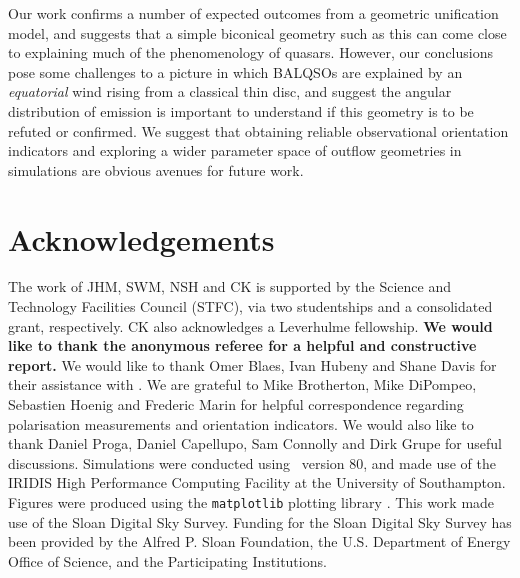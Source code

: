 \documentclass[useAMS,usenatbib]{mn2e_x}
\begin{document}
Our work confirms a number of expected outcomes from a geometric unification 
model, and suggests that a simple biconical geometry such as this can come close to 
explaining much of the  phenomenology of quasars. However, our conclusions pose 
some challenges to a picture in which BALQSOs are
explained by an {\em equatorial} wind rising from a classical thin disc, and suggest 
the angular distribution of emission is important to understand if this 
geometry is to be refuted or confirmed. We suggest that obtaining reliable 
observational orientation indicators and 
exploring a wider parameter space of outflow geometries in simulations
are obvious avenues for future work.


\section*{Acknowledgements}

The work of JHM, SWM, NSH and CK is supported by the
Science and Technology Facilities Council (STFC),
via two studentships and a consolidated grant, respectively.
CK also acknowledges a Leverhulme fellowship.
{\bf We would like to thank the anonymous referee for a helpful
and constructive report.}
We would like to thank Omer Blaes, Ivan Hubeny and Shane Davis for their
assistance with \agn. We are grateful to Mike Brotherton, Mike DiPompeo,
Sebastien Hoenig and Frederic Marin for helpful correspondence regarding
polarisation measurements and orientation indicators.
We would also like to thank Daniel Proga, Daniel Capellupo, Sam Connolly and
Dirk Grupe for useful discussions.  Simulations were conducted using \py\ version 80,
and made use of the IRIDIS High Performance Computing Facility at the
University of Southampton. Figures were produced using the {\tt matplotlib} 
plotting library \citep{matplotlib}. This work made use of the Sloan Digital Sky Survey.
Funding for the Sloan Digital Sky Survey has been provided by
the Alfred P. Sloan Foundation, the U.S. Department of Energy Office of
Science, and the Participating Institutions.


\setlength{\bibsep}{0pt}

\end{document}
